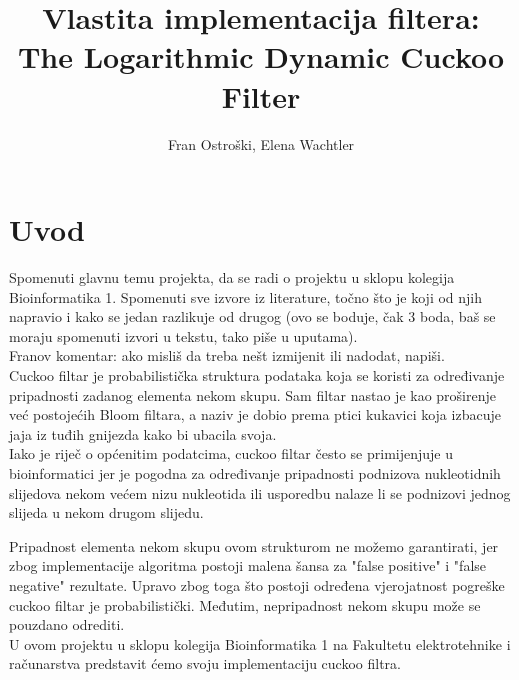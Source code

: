 \documentclass[times, utf8, seminar, numeric]{fer}
\begin{document}
\nocite{*}

\title{Vlastita implementacija filtera: \protect\\ The Logarithmic Dynamic Cuckoo Filter}

\author{Fran Ostroški, Elena Wachtler}


\maketitle

\tableofcontents

\chapter{Uvod}

Spomenuti glavnu temu projekta, da se radi o projektu u sklopu kolegija Bioinformatika 1. Spomenuti sve izvore iz literature, točno što je koji od njih napravio i kako se jedan razlikuje od drugog (ovo se boduje, čak 3 boda, baš se moraju spomenuti izvori u tekstu, tako piše u uputama). \\
 
Franov komentar: ako misliš da treba nešt izmijenit ili nadodat, napiši. \\

Cuckoo filtar je probabilistička struktura podataka koja se koristi za određivanje pripadnosti zadanog elementa nekom skupu. Sam filtar nastao je kao proširenje već postojećih Bloom filtara, a naziv je dobio prema ptici kukavici koja izbacuje jaja iz tuđih gnijezda kako bi ubacila svoja. \\Iako je riječ o općenitim podatcima, cuckoo filtar često se primijenjuje u bioinformatici jer je pogodna za određivanje pripadnosti podnizova nukleotidnih slijedova nekom većem nizu nukleotida ili usporedbu nalaze li se podnizovi jednog slijeda u nekom drugom slijedu.

Pripadnost elementa nekom skupu ovom strukturom ne možemo garantirati, jer zbog implementacije algoritma postoji malena šansa za "false positive" i "false negative" rezultate. Upravo zbog toga što postoji određena vjerojatnost pogreške cuckoo filtar je probabilistički. Međutim, nepripadnost nekom skupu može se pouzdano odrediti. \\

U ovom projektu u sklopu kolegija Bioinformatika 1 na Fakultetu elektrotehnike i računarstva predstavit ćemo svoju implementaciju cuckoo filtra. \\
\end{document}
